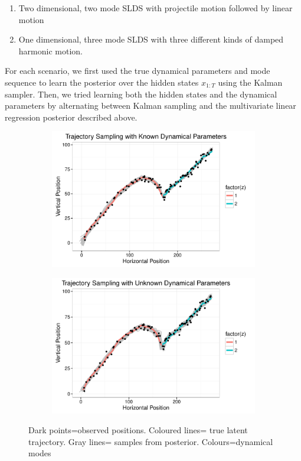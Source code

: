 \documentclass{article} %
\begin{document}
\begin{enumerate}
\item Two dimensional, two mode SLDS with projectile motion followed by linear motion
\item One dimensional, three mode SLDS with three different kinds of damped harmonic motion.
\end{enumerate}

For each scenario, we first used the true dynamical parameters and mode sequence to learn the posterior over the hidden states $x_{1:T}$ using the Kalman sampler. Then, we tried learning both the hidden states and the dynamical parameters by alternating between Kalman sampling and the multivariate linear regression posterior described above.

\begin{figure}
\begin{subfigure}[b]{\textwidth}
  \centering
  \includegraphics[width = \linewidth]{"./plot/lds/01_projectile_known"}
\end{subfigure}

\begin{subfigure}[b]{\textwidth}
   \includegraphics[width = \linewidth]{"./plot/lds/02_projectile_unknown"}
 \end{subfigure}
   \caption{Dark points=observed positions. Coloured lines= true latent trajectory. Gray lines= samples from posterior. Colours=dynamical modes}
\end{figure}
\end{document}
